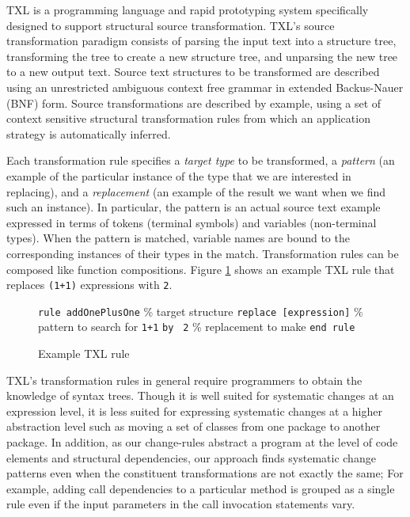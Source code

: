 \documentclass[runningheads,a4paper]{llncs}
\newcommand{\codefont}[1]{\footnotesize{\texttt{#1}}\normalsize}
\begin{document}
TXL is a programming language and rapid prototyping system specifically designed to support structural source transformation. TXL's source transformation paradigm consists of parsing the input text into a structure tree, transforming the tree to create a new structure tree, and unparsing the new tree to a new output text. Source text structures to be transformed are described using an unrestricted ambiguous context free grammar in extended Backus-Nauer (BNF) form. Source transformations are described by example, using a set of context sensitive structural transformation rules from which an application strategy is automatically inferred. 

Each transformation rule specifies a {\em target type} to be transformed, a {\em pattern} (an example of the particular instance of the type that we are interested in replacing), and a {\em replacement} (an example of the result we want when we find such an instance). In particular, the pattern is an actual source text example expressed in terms of tokens (terminal symbols) and variables (non-terminal types). When the pattern is matched, variable names are bound to the corresponding instances of their types in the match. Transformation rules can be composed like function compositions.  Figure \ref{txl_rule} shows an example TXL rule that replaces \codefont{(1+1)} expressions with \codefont{2}. 

\begin{figure} 
\codefont{rule addOnePlusOne} \% target structure \newline
\indent \codefont{replace [expression]}  \% pattern to search for \newline
\indent \indent \codefont{1+1} \newline
\indent \codefont{by } 
\indent \indent \codefont{2} \newline \% replacement to make \newline
\codefont{end rule} \newline
\caption{Example TXL rule} 
\label{txl_rule} 
\end{figure} 

TXL's transformation rules in general require programmers to obtain the knowledge of syntax trees. Though it is well suited for systematic changes at an expression level, it is less suited for expressing systematic changes at a higher abstraction level such as moving a set of classes from one package to another package. In addition, as our change-rules abstract a program at the level of code elements and structural dependencies, our approach finds systematic change patterns even when the constituent transformations are not exactly the same; For example, adding call dependencies to a particular method is grouped as a single rule even if the input parameters in the call invocation statements vary. 
\end{document}
